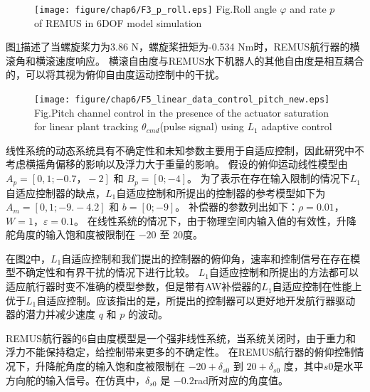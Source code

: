 \begin{figure}[!htp]
 \centering
 \texttt{[image: figure/chap6/F3\_p\_roll.eps]}
 \label{fig:chap6:F16}
  {Fig.}{Roll angle $\varphi$ and rate $p$ of REMUS in 6DOF model simulation}
 \end{figure}

图\ref{fig:chap6:F16}描述了当螺旋桨力为3.86 N，螺旋桨扭矩为-0.534 Nm时，REMUS航行器的横滚角和横滚速度响应。 横滚自由度与REMUS水下机器人的其他自由度是相互耦合的，可以将其视为俯仰自由度运动控制中的干扰。

\begin{figure}[!htp]
 \centering
 \texttt{[image: figure/chap6/F5\_linear\_data\_control\_pitch\_new.eps]}
 \label{fig:chap6:F17}
  {Fig.}{Pitch channel control in the presence of the actuator saturation for linear plant tracking $\theta_{cmd}$(pulse signal) using \texorpdfstring {$L_1$}{} adaptive control }
 \end{figure}

线性系统的动态系统具有不确定性和未知参数主要用于自适应控制，因此研究中不考虑横摇角偏移的影响以及浮力大于重量的影响。 假设的俯仰运动线性模型由 $A_p = [0,1; -0.7，-2]$ 和 $B_p = [0; -4]$。 为了表示在存在输入限制的情况下$L_{1}$自适应控制器的缺点，$L_{1}$自适应控制和所提出的控制器的参考模型如下为 $A_m = [0,1; -9.-4.2]$ 和 $b = [0; - 9]$。 补偿器的参数列出如下：$\rho = 0.01$，$W = 1$，$\varepsilon = 0.1$。 在线性系统的情况下，由于物理空间内输入值的有效性，升降舵角度的输入饱和度被限制在 $-20$ 至 $20$度。

在图\ref{fig:chap6:F17}中，$L_{1}$自适应控制和我们提出的控制器的俯仰角，速率和控制信号在存在模型不确定性和有界干扰的情况下进行比较。 $L_{1}$自适应控制和所提出的方法都可以适应航行器时变不准确的模型参数，但是带有AW补偿器的$L_{1}$自适应控制在性能上优于$L_{1}$自适应控制。应该指出的是，所提出的控制器可以更好地开发航行器驱动器的潜力并减少速度 $q$ 和 $p$ 的波动。

REMUS航行器的6自由度模型是一个强非线性系统，当系统关闭时，由于重力和浮力不能保持稳定，给控制带来更多的不确定性。 在REMUS航行器的俯仰控制情况下，升降舵角度的输入饱和度被限制在 $-20 + \delta_ {s0}$ 到 $20 + \delta_{s0}$ 度，其中$s0$是水平方向舵的输入信号。在仿真中，$\delta_{s0}$ 是 $-0.2$rad所对应的角度值。

